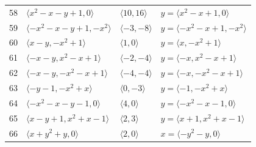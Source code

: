 \documentclass[11pt]{article}
\begin{document}
\begin{longtable}{@{}rlll@{}}
58 & $\langle x^{2}-x-y+1,0\rangle$ & $\langle 10,16\rangle$ & $y=\langle x^{2}-x+1,0\rangle$\\
59 & $\langle -x^{2}-x-y+1,-x^{2}\rangle$ & $\langle -3,-8\rangle$ & $y=\langle -x^{2}-x+1,-x^{2}\rangle$\\
60 & $\langle x-y,-x^{2}+1\rangle$ & $\langle 1,0\rangle$ & $y=\langle x,-x^{2}+1\rangle$\\
61 & $\langle -x-y,x^{2}-x+1\rangle$ & $\langle -2,-4\rangle$ & $y=\langle -x,x^{2}-x+1\rangle$\\
62 & $\langle -x-y,-x^{2}-x+1\rangle$ & $\langle -4,-4\rangle$ & $y=\langle -x,-x^{2}-x+1\rangle$\\
63 & $\langle -y-1,-x^{2}+x\rangle$ & $\langle 0,-3\rangle$ & $y=\langle -1,-x^{2}+x\rangle$\\
64 & $\langle -x^{2}-x-y-1,0\rangle$ & $\langle 4,0\rangle$ & $y=\langle -x^{2}-x-1,0\rangle$\\
65 & $\langle x-y+1,x^{2}+x-1\rangle$ & $\langle 2,3\rangle$ & $y=\langle x+1,x^{2}+x-1\rangle$\\
66 & $\langle x+y^{2}+y,0\rangle$ & $\langle 2,0\rangle$ & $x=\langle -y^{2}-y,0\rangle$\\
\end{longtable}
\endgroup
\end{document}
